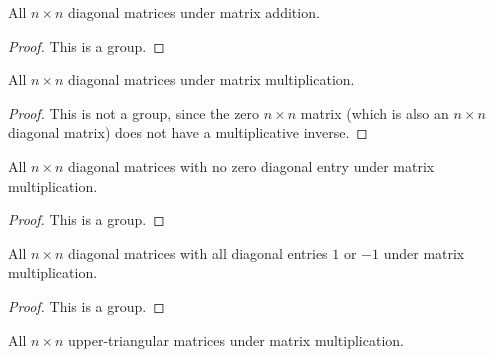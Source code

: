 \newpage
\begin{exercise}
    All $n\times n$ diagonal matrices under matrix addition.
\end{exercise}

\begin{proof}
    This is a group.
\end{proof}

\newpage
\begin{exercise}
    All $n\times n$ diagonal matrices under matrix multiplication.
\end{exercise}

\begin{proof}
    This is not a group, since the zero $n\times n$ matrix (which is also an $n\times n$ diagonal matrix) does not have a multiplicative inverse.
\end{proof}

\newpage
\begin{exercise}
    All $n\times n$ diagonal matrices with no zero diagonal entry under matrix multiplication.
\end{exercise}

\begin{proof}
    This is a group.
\end{proof}

\newpage
\begin{exercise}
    All $n\times n$ diagonal matrices with all diagonal entries $1$ or $-1$ under matrix multiplication.
\end{exercise}

\begin{proof}
    This is a group.
\end{proof}

\newpage
\begin{exercise}
    All $n\times n$ upper-triangular matrices under matrix multiplication.
\end{exercise}

